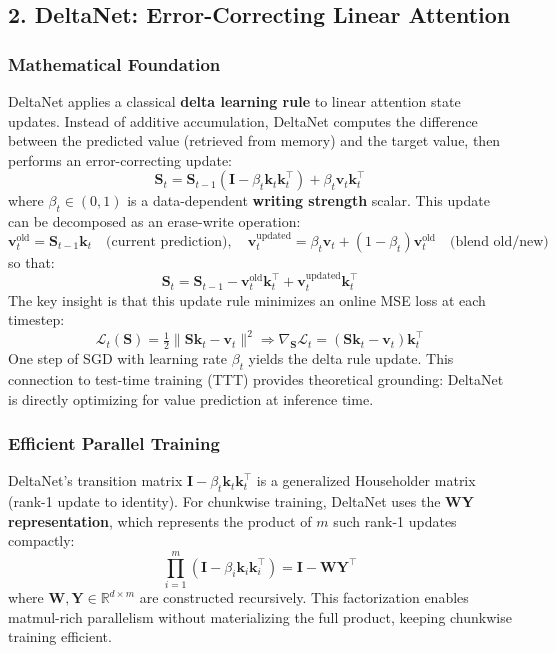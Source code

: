 \subsection{2. DeltaNet: Error-Correcting Linear Attention}

\subsubsection{Mathematical Foundation}

DeltaNet \citep{yang_deltanet_2024} applies a classical \textbf{delta learning rule} to linear attention state updates. Instead of additive accumulation, DeltaNet computes the difference between the predicted value (retrieved from memory) and the target value, then performs an error-correcting update:
\[
\mathbf{S}_t = \mathbf{S}_{t-1}(\mathbf{I} - \beta_t \mathbf{k}_t \mathbf{k}_t^\top) + \beta_t \mathbf{v}_t \mathbf{k}_t^\top
\]
where $\beta_t \in (0,1)$ is a data-dependent \textbf{writing strength} scalar. This update can be decomposed as an erase-write operation:
\[
\mathbf{v}_t^\text{old} = \mathbf{S}_{t-1} \mathbf{k}_t \quad \text{(current prediction)}, \quad
\mathbf{v}_t^\text{updated} = \beta_t \mathbf{v}_t + (1-\beta_t)\mathbf{v}_t^\text{old} \quad \text{(blend old/new)}
\]
so that:
\[
\mathbf{S}_t = \mathbf{S}_{t-1} - \mathbf{v}_t^\text{old}\mathbf{k}_t^\top + \mathbf{v}_t^\text{updated}\mathbf{k}_t^\top
\]
The key insight is that this update rule minimizes an online MSE loss at each timestep:
\[
\mathcal{L}_t(\mathbf{S}) = \tfrac{1}{2}\|\mathbf{S}\mathbf{k}_t - \mathbf{v}_t\|^2 \Rightarrow \nabla_{\mathbf{S}} \mathcal{L}_t = (\mathbf{S}\mathbf{k}_t - \mathbf{v}_t)\mathbf{k}_t^\top
\]
One step of SGD with learning rate $\beta_t$ yields the delta rule update. This connection to test-time training (TTT) provides theoretical grounding: DeltaNet is directly optimizing for value prediction at inference time.

\subsubsection{Efficient Parallel Training}

DeltaNet's transition matrix $\mathbf{I} - \beta_t \mathbf{k}_t \mathbf{k}_t^\top$ is a generalized Householder matrix (rank-1 update to identity). For chunkwise training, DeltaNet uses the \textbf{WY representation}, which represents the product of $m$ such rank-1 updates compactly:
\[
\prod_{i=1}^{m} (\mathbf{I} - \beta_i \mathbf{k}_i \mathbf{k}_i^\top) = \mathbf{I} - \mathbf{W}\mathbf{Y}^\top
\]
where $\mathbf{W}, \mathbf{Y} \in \mathbb{R}^{d \times m}$ are constructed recursively. This factorization enables matmul-rich parallelism without materializing the full product, keeping chunkwise training efficient.

